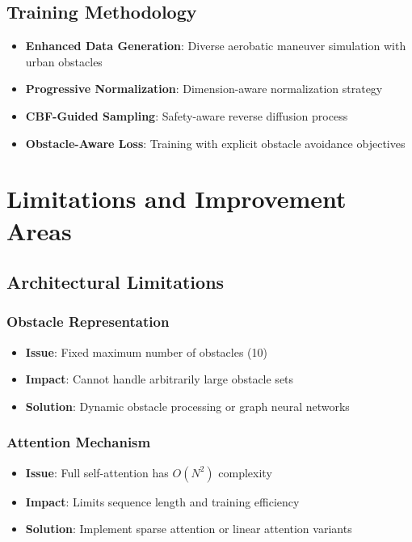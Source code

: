 \documentclass[12pt]{article}
\begin{document}
\subsection{Training Methodology}

\begin{itemize}
    \item \textbf{Enhanced Data Generation}: Diverse aerobatic maneuver simulation with urban obstacles
    \item \textbf{Progressive Normalization}: Dimension-aware normalization strategy
    \item \textbf{CBF-Guided Sampling}: Safety-aware reverse diffusion process
    \item \textbf{Obstacle-Aware Loss}: Training with explicit obstacle avoidance objectives
\end{itemize}

\section{Limitations and Improvement Areas}

\subsection{Architectural Limitations}

\subsubsection{Obstacle Representation}

\begin{itemize}
    \item \textbf{Issue}: Fixed maximum number of obstacles (10)
    \item \textbf{Impact}: Cannot handle arbitrarily large obstacle sets
    \item \textbf{Solution}: Dynamic obstacle processing or graph neural networks
\end{itemize}

\subsubsection{Attention Mechanism}

\begin{itemize}
    \item \textbf{Issue}: Full self-attention has $O(N^2)$ complexity
    \item \textbf{Impact}: Limits sequence length and training efficiency
    \item \textbf{Solution}: Implement sparse attention or linear attention variants
\end{itemize}
\end{document}
